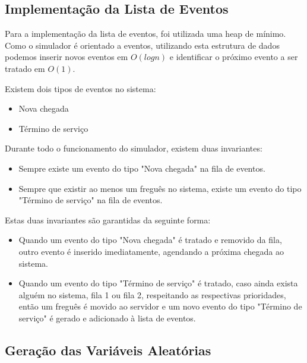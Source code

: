 \documentclass[a4paper,10pt]{article}
\begin{document}
\subsection{Implementação da Lista de Eventos}

	Para a implementação da lista de eventos, foi utilizada uma heap de mínimo. Como o simulador é orientado a eventos, utilizando esta estrutura
	de dados podemos inserir novos eventos em $O(log n)$ e identificar o próximo evento a ser tratado em $O(1)$.

	Existem dois tipos de eventos no sistema:
	\begin{itemize}
		\item Nova chegada
		\item Término de serviço
	\end{itemize}

	Durante todo o funcionamento do simulador, existem duas invariantes:
	\begin{itemize}
		\item Sempre existe um evento do tipo "Nova chegada" na fila de eventos.
		\item Sempre que existir ao menos um freguês no sistema, existe um evento do tipo "Término de serviço" na fila de eventos.
	\end{itemize}

	Estas duas invariantes são garantidas da seguinte forma:
	\begin{itemize}
		\item Quando um evento do tipo "Nova chegada" é tratado e removido da fila, outro evento é inserido imediatamente, agendando a próxima chegada ao sistema.
		\item Quando um evento do tipo "Término de serviço" é tratado, caso ainda exista alguém no sistema, fila 1 ou fila 2, respeitando as respectivas prioridades, então um freguês é movido ao servidor e um novo evento do tipo "Término de serviço" é gerado e adicionado à lista de eventos.
    \end{itemize}

\subsection{Geração das Variáveis Aleatórias}
\end{document}
